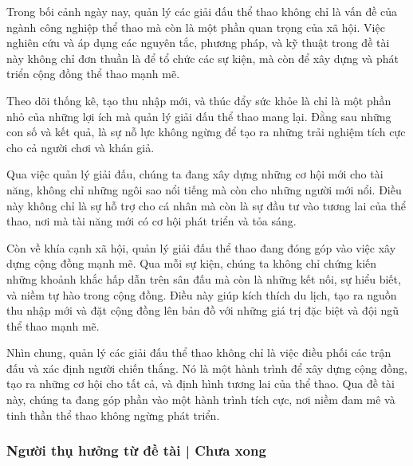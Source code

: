 Trong bối cảnh ngày nay, quản lý các giải đấu thể thao không chỉ là vấn đề của ngành công nghiệp thể thao mà còn là một phần quan trọng của xã hội. Việc nghiên cứu và áp dụng các nguyên tắc, phương pháp, và kỹ thuật trong đề tài này không chỉ đơn thuần là để tổ chức các sự kiện, mà còn để xây dựng và phát triển cộng đồng thể thao mạnh mẽ.
\par
Theo dõi thống kê, tạo thu nhập mới, và thúc đẩy sức khỏe là chỉ là một phần nhỏ của những lợi ích mà quản lý giải đấu thể thao mang lại. Đằng sau những con số và kết quả, là sự nỗ lực không ngừng để tạo ra những trải nghiệm tích cực cho cả người chơi và khán giả.
\par
Qua việc quản lý giải đấu, chúng ta đang xây dựng những cơ hội mới cho tài năng, không chỉ những ngôi sao nổi tiếng mà còn cho những người mới nổi. Điều này không chỉ là sự hỗ trợ cho cá nhân mà còn là sự đầu tư vào tương lai của thể thao, nơi mà tài năng mới có cơ hội phát triển và tỏa sáng.
\par
Còn về khía cạnh xã hội, quản lý giải đấu thể thao đang đóng góp vào việc xây dựng cộng đồng mạnh mẽ. Qua mỗi sự kiện, chúng ta không chỉ chứng kiến những khoảnh khắc hấp dẫn trên sân đấu mà còn là những kết nối, sự hiểu biết, và niềm tự hào trong cộng đồng. Điều này giúp kích thích du lịch, tạo ra nguồn thu nhập mới và đặt cộng đồng lên bản đồ với những giá trị đặc biệt và đội ngũ thể thao mạnh mẽ.
\par
Nhìn chung, quản lý các giải đấu thể thao không chỉ là việc điều phối các trận đấu và xác định người chiến thắng. Nó là một hành trình để xây dựng cộng đồng, tạo ra những cơ hội cho tất cả, và định hình tương lai của thể thao. Qua đề tài này, chúng ta đang góp phần vào một hành trình tích cực, nơi niềm đam mê và tinh thần thể thao không ngừng phát triển.


\subsubsection{Người thụ hưởng từ đề tài | Chưa xong}
